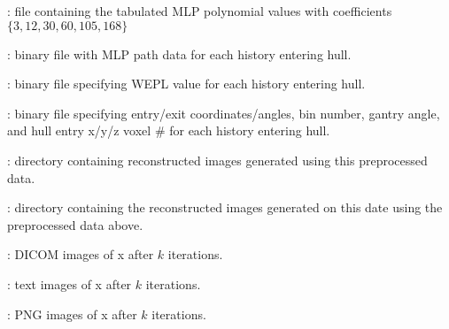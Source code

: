 \documentclass[landscape,12pt]{article}
\begin{document}
\begin{myEnumerate}[labelindent=1pt, leftmargin=*]
\begin{myEnumerate}[labelindent=1pt, leftmargin=*]
\begin{myEnumerate}[labelindent=1pt, leftmargin=*]
\begin{myEnumerate}[labelindent=1pt, leftmargin=*]
\begin{myEnumerate}[labelindent=1pt, leftmargin=*]
\begin{myEnumerate}[labelindent=1pt, leftmargin=*]
\begin{myEnumerate}[labelindent=1pt, leftmargin=*]
\begin{myEnumerate}[labelindent=1pt, leftmargin=*]
\begin{myEnumerate}[labelindent=1pt, leftmargin=*]
                                        \item {} \color{Black}: file containing the tabulated MLP polynomial values with coefficients $\{3,12,30,60,105,168\}$
                                        \item {} \color{Black}: binary file with MLP path data for each history entering hull.
                                        \item {} \color{Black}: binary file specifying WEPL value for each history entering hull.
                                        \item {} \color{Black}: binary file specifying entry/exit coordinates/angles, bin number, gantry angle, and hull entry x/y/z voxel \# for each history entering hull.
                                        \item {} \color{Black}: directory containing reconstructed images generated using this preprocessed data.
                                        \begin{myEnumerate}[labelindent=1pt, leftmargin=*]
                                            \item {} \color{Black}: directory containing the reconstructed images generated on this date using the preprocessed data above.
                                                \begin{myEnumerate}[labelindent=1pt, leftmargin=*]
                                                    \item {} \color{Black}: DICOM images of x after $k$ iterations.
                                                    \item {} \color{Black}: text images of x after $k$ iterations.
                                                    \item {} \color{Black}: PNG images of x after $k$ iterations.
                                                \end{myEnumerate}
                                        \end{myEnumerate}
                                    \end{myEnumerate}

\end{myEnumerate}
\end{myEnumerate}
\end{myEnumerate}
\end{myEnumerate}
\end{myEnumerate}
\end{myEnumerate}
\end{myEnumerate}
\end{myEnumerate}
\end{document}
